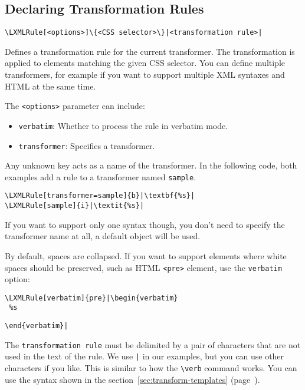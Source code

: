 \documentclass{ltxdoc}
\begin{document}
\subsection{Declaring Transformation Rules}



\begin{verbatim}
\LXMLRule[<options>]\{<CSS selector>\}|<transformation rule>|
\end{verbatim}

\noindent Defines a transformation rule for the current transformer. The transformation
is applied to elements matching the given CSS selector. You can define multiple transformers, 
for example if you want to support multiple XML syntaxes and HTML at the same time.

\medskip

\noindent The \texttt{<options>} parameter can include:

\begin{itemize}
    \item \texttt{verbatim}: Whether to process the rule in verbatim mode.
    \item \texttt{transformer}: Specifies a transformer.
\end{itemize}

Any unknown key acts as a name of the transformer. In the following code, both
examples add a rule to a transformer named \texttt{sample}.

\begin{verbatim}
\LXMLRule[transformer=sample]{b}|\textbf{%s}|
\LXMLRule[sample]{i}|\textit{%s}|
\end{verbatim}

If you want to support only one syntax though, you don't need to specify the transformer name at all,
a default object will be used.

By default, spaces are collapsed. If you want to support elements where white spaces 
should be preserved, such as HTML \verb|<pre>| element, use the \verb|verbatim| option:

\begin{verbatim}
\LXMLRule[verbatim]{pre}|\begin{verbatim}
 %s
\end{verbatim}
\verb+\end{verbatim}|+

\bigskip

The \texttt{transformation rule} must be delimited by a pair of characters that are not used in the 
text of the rule. We use \verb+|+ in our examples, but you can use other characters if you like. 
This is similar to how the \verb|\verb| command works. You can use the syntax 
shown in the section~\ref{sec:transform-templates} (page~\pageref{sec:transform-templates}).
\end{document}
